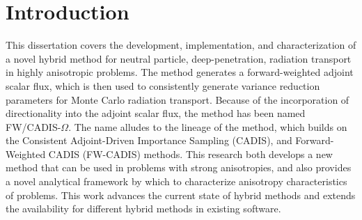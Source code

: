 \chapter{Introduction}
\label{ch:introduction}

This dissertation covers the development,
implementation, and characterization
of a novel hybrid method for neutral particle, deep-penetration, radiation transport in
highly anisotropic problems. The method generates a forward-weighted adjoint
scalar flux, which is then used to consistently generate variance reduction
parameters for Monte Carlo radiation transport. Because of the incorporation
of directionality into the adjoint scalar flux,
the method has been named FW/CADIS-$\Omega$. The name alludes to the lineage of
the method, which builds on
the Consistent Adjoint-Driven Importance Sampling (CADIS), and
Forward-Weighted CADIS (FW-CADIS) methods. %
This research both develops a new method that can be used in problems with
strong anisotropies, and also provides a novel
analytical framework by which to characterize anisotropy characteristics of problems. This
work advances the current state of hybrid methods and extends the availability
for different hybrid methods in existing software.




% 



